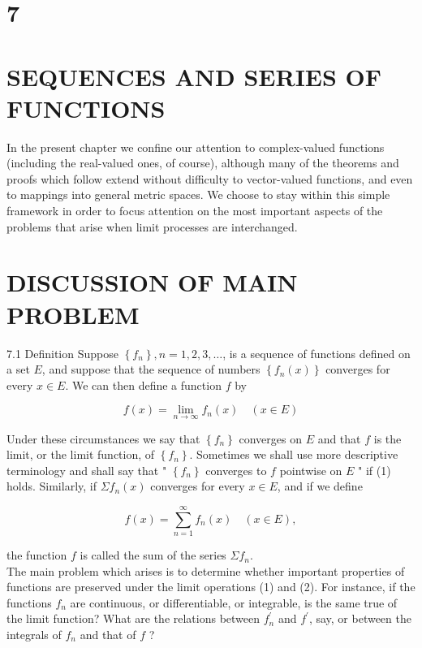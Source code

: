 \documentclass[10pt]{article}
\begin{document}
\section*{7}
\section*{SEQUENCES AND SERIES OF FUNCTIONS}
In the present chapter we confine our attention to complex-valued functions (including the real-valued ones, of course), although many of the theorems and proofs which follow extend without difficulty to vector-valued functions, and even to mappings into general metric spaces. We choose to stay within this simple framework in order to focus attention on the most important aspects of the problems that arise when limit processes are interchanged.

\section*{DISCUSSION OF MAIN PROBLEM}
7.1 Definition Suppose $\left\{f_{n}\right\}, n=1,2,3, \ldots$, is a sequence of functions defined on a set $E$, and suppose that the sequence of numbers $\left\{f_{n}(x)\right\}$ converges for every $x \in E$. We can then define a function $f$ by


\begin{equation*}
f(x)=\lim _{n \rightarrow \infty} f_{n}(x) \quad(x \in E) \tag{1}
\end{equation*}


Under these circumstances we say that $\left\{f_{n}\right\}$ converges on $E$ and that $f$ is the limit, or the limit function, of $\left\{f_{n}\right\}$. Sometimes we shall use more descriptive terminology and shall say that " $\left\{f_{n}\right\}$ converges to $f$ pointwise on $E$ " if (1) holds. Similarly, if $\Sigma f_{n}(x)$ converges for every $x \in E$, and if we define


\begin{equation*}
f(x)=\sum_{n=1}^{\infty} f_{n}(x) \quad(x \in E), \tag{2}
\end{equation*}


the function $f$ is called the sum of the series $\Sigma f_{n}$.\\
The main problem which arises is to determine whether important properties of functions are preserved under the limit operations (1) and (2). For instance, if the functions $f_{n}$ are continuous, or differentiable, or integrable, is the same true of the limit function? What are the relations between $f_{n}^{\prime}$ and $f^{\prime}$, say, or between the integrals of $f_{n}$ and that of $f$ ?
\end{document}
